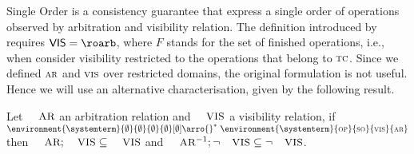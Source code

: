 		


		






Single Order is a consistency guarantee that express a single order of operations observed by arbitration and visibility relation. The definition introduced by \cite{} requires 
$\ovis = \roarb$, where $F$ stands for the set of finished operations, i.e., when consider visibility restricted to the operations that belong to $\textsc{\scriptsize{TC}}$. 
Since we defined $\textsc{\scriptsize{AR}}$ and $\textsc{\scriptsize{VIS}}$ over restricted domains, the original formulation is not useful. Hence we will use an alternative characterisation, given by the 
following result.

\begin{theorem}
\label{thm:single-order}
Let $\textsc{\small{AR}}$ an arbitration relation and $\textsc{\small{VIS}}$ a visibility relation, if $\environment{\systemterm}{\emptyset}{\emptyset}{\emptyset}{\emptyset}[\emptyset] \arro{} ^*\ \environment{\systemterm}{\op}{\so}{\vis}{\arb} $ then $\textsc{\small{AR}};\textsc{\small{VIS}} \subseteq \textsc{\small{VIS}}$ and  $\textsc{\small{AR}}^{-1};\neg\textsc{\small{VIS}} \subseteq \neg\textsc{\small{VIS}}$.


\end{theorem}
 

